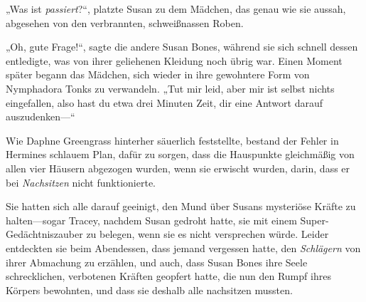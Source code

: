 \later

„Was ist \emph{passiert}?“, platzte Susan zu dem Mädchen, das genau wie sie aussah, abgesehen von den verbrannten, schweißnassen Roben.

„Oh, gute Frage!“, sagte die andere Susan Bones, während sie sich schnell dessen entledigte, was von ihrer geliehenen Kleidung noch übrig war. Einen Moment später begann das Mädchen, sich wieder in ihre gewohntere Form von Nymphadora Tonks zu verwandeln. „Tut mir leid, aber mir ist selbst nichts eingefallen, also hast du etwa drei Minuten Zeit, dir eine Antwort darauf auszudenken—“

\later

Wie Daphne Greengrass hinterher säuerlich feststellte, bestand der Fehler in Hermines schlauem Plan, dafür zu sorgen, dass die Hauspunkte gleichmäßig von allen vier Häusern abgezogen wurden, wenn sie erwischt wurden, darin, dass er bei \emph{Nachsitzen} nicht funktionierte.

Sie hatten sich alle darauf geeinigt, den Mund über Susans mysteriöse Kräfte zu halten—sogar Tracey, nachdem Susan gedroht hatte, sie mit einem Super-Gedächtniszauber zu belegen, wenn sie es nicht versprechen würde. Leider entdeckten sie beim Abendessen, dass jemand vergessen hatte, den \emph{Schlägern} von ihrer Abmachung zu erzählen, und auch, dass Susan Bones ihre Seele schrecklichen, verbotenen Kräften geopfert hatte, die nun den Rumpf ihres Körpers bewohnten, und dass sie deshalb alle nachsitzen mussten.

